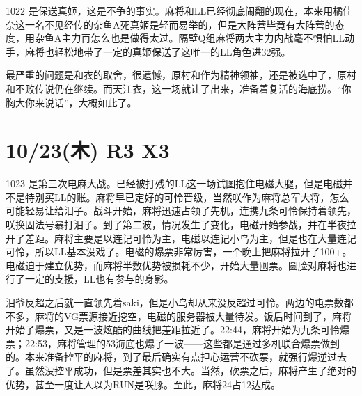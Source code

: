 1022 是保送真姬，这是不争的事实。麻将和LL已经彻底闹翻的现在，本来用橘佳奈这一名不见经传的杂鱼A死真姬是轻而易举的，但是大阵营毕竟有大阵营的态度，用杂鱼A主力再怎么也是做得太过。隔壁Q组麻将两大主力内战毫不惧怕LL动手，麻将也轻松地带了一定的真姬保送了这唯一的LL角色进32强。

最严重的问题是和衣的取舍，很遗憾，原村和作为精神领袖，还是被选中了，原村和不败传说仍在继续。而天江衣，这一场就让了出来，准备着复活的海底捞。“你胸大你来说话”，大概如此了。

\section{10/23(木) R3 X3}


1023 是第三次电麻大战。已经被打残的LL这一场试图抱住电磁大腿，但是电磁并不是特别买LL的账。麻将早已定好的可怜晋级，当然咲作为麻将总军大将，怎么可能轻易让给泪子。战斗开始，麻将迅速占领了先机，连携九条可怜保持着领先，咲换固法号暴打泪子。到了第二波，情况发生了变化，电磁开始参战，并在半夜拉开了差距。麻将主要是以连记可怜为主，电磁以连记小鸟为主，但是也在大量连记可怜，所以LL基本没戏了。电磁的爆票非常厉害，一个晚上把麻将拉开了100+。电磁迫于建立优势，而麻将半数优势被损耗不少，开始大量囤票。圆脸对麻将也进行了一定的支援，LL也有参与的身影。

泪爷反超之后就一直领先着saki，但是小鸟却从来没反超过可怜。两边的屯票数都不多，麻将的VG票源接近挖空，电磁的服务器被大量待发。饭后时间到了，麻将开始了爆票，又是一波炫酷的曲线把差距拉近了。22:44，麻将开始为九条可怜爆票；22:53，麻将管理的53海底也爆了一波——这些都是通过多机联合爆票做到的。本来准备控平的麻将，到了最后确实有点担心运营不砍票，就强行爆逆过去了。虽然没控平成功，但是票差其实也不大。当然，砍票之后，麻将产生了绝对的优势，甚至一度让人以为RUN是咲豚。至此，麻将24占12达成。

